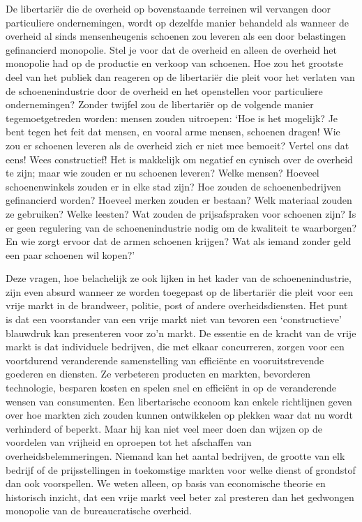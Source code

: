 \documentclass[
  a5paper,
  smalldemyvopaper,10pt,twoside,onecolumn,openright,extrafontsizes,hidelinks]{memoir}
\begin{document}
De libertariër die de overheid op bovenstaande terreinen wil vervangen
door particuliere ondernemingen, wordt op dezelfde manier behandeld als
wanneer de overheid al sinds mensenheugenis schoenen zou leveren als een
door belastingen gefinancierd monopolie. Stel je voor dat de overheid en
alleen de overheid het monopolie had op de productie en verkoop van
schoenen. Hoe zou het grootste deel van het publiek dan reageren op de
libertariër die pleit voor het verlaten van de schoenenindustrie door de
overheid en het openstellen voor particuliere ondernemingen? Zonder
twijfel zou de libertariër op de volgende manier tegemoetgetreden
worden: mensen zouden uitroepen: `Hoe is het mogelijk? Je bent tegen het
feit dat mensen, en vooral arme mensen, schoenen dragen! Wie zou er
schoenen leveren als de overheid zich er niet mee bemoeit? Vertel ons
dat eens! Wees constructief! Het is makkelijk om negatief en cynisch
over de overheid te zijn; maar wie zouden er nu schoenen leveren? Welke
mensen? Hoeveel schoenenwinkels zouden er in elke stad zijn? Hoe zouden
de schoenenbedrijven gefinancierd worden? Hoeveel merken zouden er
bestaan? Welk materiaal zouden ze gebruiken? Welke leesten? Wat zouden
de prijsafspraken voor schoenen zijn? Is er geen regulering van de
schoenenindustrie nodig om de kwaliteit te waarborgen? En wie zorgt
ervoor dat de armen schoenen krijgen? Wat als iemand zonder geld een
paar schoenen wil kopen?'

Deze vragen, hoe belachelijk ze ook lijken in het kader van de
schoenenindustrie, zijn even absurd wanneer ze worden toegepast op de
libertariër die pleit voor een vrije markt in de brandweer, politie,
post of andere overheidsdiensten. Het punt is dat een voorstander van
een vrije markt niet van tevoren een `constructieve' blauwdruk kan
presenteren voor zo'n markt. De essentie en de kracht van de vrije markt
is dat individuele bedrijven, die met elkaar concurreren, zorgen voor
een voortdurend veranderende samenstelling van efficiënte en
vooruitstrevende goederen en diensten. Ze verbeteren producten en
markten, bevorderen technologie, besparen kosten en spelen snel en
efficiënt in op de veranderende wensen van consumenten. Een
libertarische econoom kan enkele richtlijnen geven over hoe markten zich
zouden kunnen ontwikkelen op plekken waar dat nu wordt verhinderd of
beperkt. Maar hij kan niet veel meer doen dan wijzen op de voordelen van
vrijheid en oproepen tot het afschaffen van overheidsbelemmeringen.
Niemand kan het aantal bedrijven, de grootte van elk bedrijf of de
prijsstellingen in toekomstige markten voor welke dienst of grondstof
dan ook voorspellen. We weten alleen, op basis van economische theorie
en historisch inzicht, dat een vrije markt veel beter zal presteren dan
het gedwongen monopolie van de bureaucratische overheid.
\end{document}
